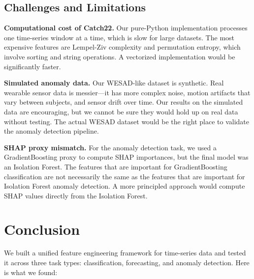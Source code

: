 \documentclass[10pt,conference]{IEEEtran}
\begin{document}
\subsection{Challenges and Limitations}

\textbf{Computational cost of Catch22.} Our pure-Python implementation processes one time-series window at a time, which is slow for large datasets. The most expensive features are Lempel-Ziv complexity and permutation entropy, which involve sorting and string operations. A vectorized implementation would be significantly faster.

\textbf{Simulated anomaly data.} Our WESAD-like dataset is synthetic. Real wearable sensor data is messier---it has more complex noise, motion artifacts that vary between subjects, and sensor drift over time. Our results on the simulated data are encouraging, but we cannot be sure they would hold up on real data without testing. The actual WESAD dataset \cite{wesad} would be the right place to validate the anomaly detection pipeline.

\textbf{SHAP proxy mismatch.} For the anomaly detection task, we used a GradientBoosting proxy to compute SHAP importances, but the final model was an Isolation Forest. The features that are important for GradientBoosting classification are not necessarily the same as the features that are important for Isolation Forest anomaly detection. A more principled approach would compute SHAP values directly from the Isolation Forest.

\section{Conclusion}

We built a unified feature engineering framework for time-series data and tested it across three task types: classification, forecasting, and anomaly detection. Here is what we found:
\end{document}
